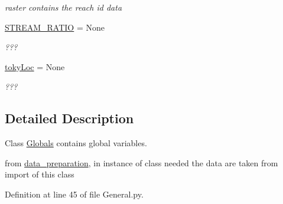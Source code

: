 \begin{DoxyCompactItemize}
\begin{DoxyCompactList}\small\item\em raster contains the reach id data \end{DoxyCompactList}\item 
\hypertarget{classsmoderp2d_1_1src_1_1main__classes_1_1General_1_1Globals_aba766256b0b8e97ca03f048d4f23e5b2}{\hyperlink{classsmoderp2d_1_1src_1_1main__classes_1_1General_1_1Globals_aba766256b0b8e97ca03f048d4f23e5b2}{S\-T\-R\-E\-A\-M\-\_\-\-R\-A\-T\-I\-O} = None}\label{classsmoderp2d_1_1src_1_1main__classes_1_1General_1_1Globals_aba766256b0b8e97ca03f048d4f23e5b2}

\begin{DoxyCompactList}\small\item\em ??? \end{DoxyCompactList}\item 
\hypertarget{classsmoderp2d_1_1src_1_1main__classes_1_1General_1_1Globals_adc1192d1698e2859edc055965c14b783}{\hyperlink{classsmoderp2d_1_1src_1_1main__classes_1_1General_1_1Globals_adc1192d1698e2859edc055965c14b783}{toky\-Loc} = None}\label{classsmoderp2d_1_1src_1_1main__classes_1_1General_1_1Globals_adc1192d1698e2859edc055965c14b783}

\begin{DoxyCompactList}\small\item\em ??? \end{DoxyCompactList}\end{DoxyCompactItemize}


\subsection{Detailed Description}
Class \hyperlink{classsmoderp2d_1_1src_1_1main__classes_1_1General_1_1Globals}{Globals} contains global variables. 

from \hyperlink{namespacesmoderp2d_1_1src_1_1data__preparation}{data\-\_\-preparation}, in instance of class needed the data are taken from import of this class 

Definition at line 45 of file General.\-py.



